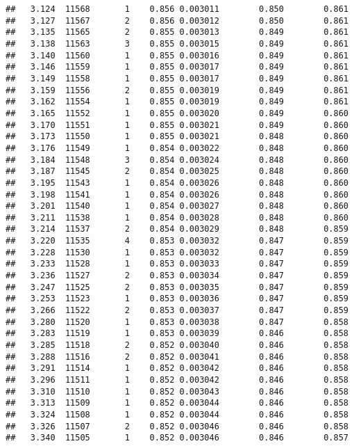 \documentclass[
]{book}
\begin{document}
\begin{verbatim}
##   3.124  11568       1    0.856 0.003011        0.850        0.861
##   3.127  11567       2    0.856 0.003012        0.850        0.861
##   3.135  11565       2    0.855 0.003013        0.849        0.861
##   3.138  11563       3    0.855 0.003015        0.849        0.861
##   3.140  11560       1    0.855 0.003016        0.849        0.861
##   3.146  11559       1    0.855 0.003017        0.849        0.861
##   3.149  11558       1    0.855 0.003017        0.849        0.861
##   3.159  11556       2    0.855 0.003019        0.849        0.861
##   3.162  11554       1    0.855 0.003019        0.849        0.861
##   3.165  11552       1    0.855 0.003020        0.849        0.860
##   3.170  11551       1    0.855 0.003021        0.849        0.860
##   3.173  11550       1    0.855 0.003021        0.848        0.860
##   3.176  11549       1    0.854 0.003022        0.848        0.860
##   3.184  11548       3    0.854 0.003024        0.848        0.860
##   3.187  11545       2    0.854 0.003025        0.848        0.860
##   3.195  11543       1    0.854 0.003026        0.848        0.860
##   3.198  11541       1    0.854 0.003026        0.848        0.860
##   3.201  11540       1    0.854 0.003027        0.848        0.860
##   3.211  11538       1    0.854 0.003028        0.848        0.860
##   3.214  11537       2    0.854 0.003029        0.848        0.859
##   3.220  11535       4    0.853 0.003032        0.847        0.859
##   3.228  11530       1    0.853 0.003032        0.847        0.859
##   3.233  11528       1    0.853 0.003033        0.847        0.859
##   3.236  11527       2    0.853 0.003034        0.847        0.859
##   3.247  11525       2    0.853 0.003035        0.847        0.859
##   3.253  11523       1    0.853 0.003036        0.847        0.859
##   3.266  11522       2    0.853 0.003037        0.847        0.859
##   3.280  11520       1    0.853 0.003038        0.847        0.858
##   3.283  11519       1    0.853 0.003039        0.846        0.858
##   3.285  11518       2    0.852 0.003040        0.846        0.858
##   3.288  11516       2    0.852 0.003041        0.846        0.858
##   3.291  11514       1    0.852 0.003042        0.846        0.858
##   3.296  11511       1    0.852 0.003042        0.846        0.858
##   3.310  11510       1    0.852 0.003043        0.846        0.858
##   3.313  11509       1    0.852 0.003044        0.846        0.858
##   3.324  11508       1    0.852 0.003044        0.846        0.858
##   3.326  11507       2    0.852 0.003046        0.846        0.858
##   3.340  11505       1    0.852 0.003046        0.846        0.857

\end{verbatim}
\end{document}
